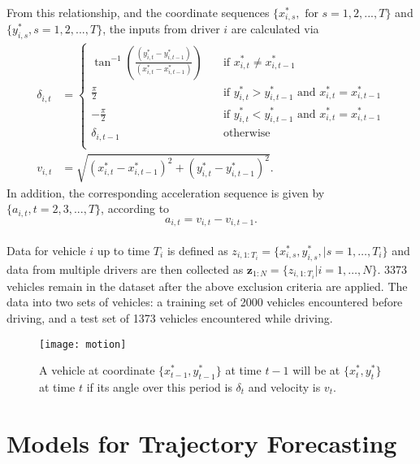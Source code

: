 \documentclass[12pt,a4paper]{article}\usepackage[]{graphicx}\usepackage[]{color}
\begin{document}
From this relationship, and the coordinate sequences $\{x^*_{i, s}, \mbox{ for }s=1,2,...,T\}$ and $\{y^*_{i, s}, s=1,2,...,T\}$, the inputs from driver $i$ are calculated via
\begin{align}
\delta_{i, t} &= 
     \begin{cases}
       \tan^{-1}\left(\frac{(y^*_{i, t} - y^*_{i, t-1})}{(x^*_{i, t} - x^*_{i, t-1})} \right)  &\quad\text{if }x^*_{i, t} \neq x^*_{i, t-1} \\
       \frac{\pi}{2} &\quad\text{if } y^*_{i, t} > y^*_{i, t-1} \mbox{ and } x^*_{i, t} = x^*_{i, t-1} \\
       -\frac{\pi}{2} &\quad\text{if } y^*_{i, t} < y^*_{i, t-1} \mbox{ and } x^*_{i, t} = x^*_{i, t-1} \\
       \delta_{i, t-1} &\quad\text{otherwise} \\ 
     \end{cases} \label{dEq} \\
v_{i, t} &= \sqrt{(x^*_{i, t} - x^*_{i, t-1})^2 + (y^*_{i, t} - y^*_{i, t-1})^2} \label{vEq}.
\end{align}
In addition, the corresponding acceleration sequence is given by $\{a_{i, t},t=2,3,...,T\}$, according to
\begin{equation}
\label{aEq}
a_{i, t} = v_{i, t} - v_{i, t-1}. 
\end{equation}
\\

Data for vehicle $i$ up to time $T_i$ is defined as $z_{i, 1:T_i} = \{x^*_{i, s}, y^*_{i, s}, | s = 1, \dots, T_i\}$ and data from multiple drivers are then collected as $\mathbf{z}_{1:N} = \{z_{i, 1:T_i} | i = 1, \dots, N\}$. 3373 vehicles remain in the dataset after the above exclusion criteria are applied. The data into two sets of vehicles: a training set of 2000 vehicles encountered before driving, and a test set of 1373 vehicles encountered while driving. 
\begin{figure}
\centering
\texttt{[image: motion]}
\caption{A vehicle at coordinate $\{x^*_{t-1}, y^*_{t-1}\}$ at time $t-1$ will be at $\{x^*_t, y^*_t\}$ at time $t$ if its angle over this period is $\delta_t$ and velocity is $v_t$.}
\label{fig:motion}
\end{figure}


\section{Models for Trajectory Forecasting}
\label{sec:models}
\end{document}
